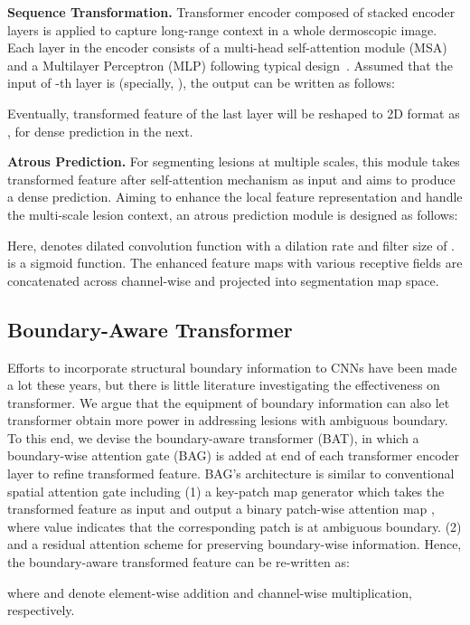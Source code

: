 \documentclass[runningheads]{paper478-llncs}
\begin{document}
\textbf{Sequence Transformation.}
Transformer encoder composed of  stacked encoder layers is applied to capture long-range context in a whole dermoscopic image. 
Each layer in the encoder consists of a multi-head self-attention module (MSA) and a Multilayer Perceptron (MLP) following typical design~\cite{vaswani2017attention}.
Assumed that the input of -th layer is  (specially, ), the output can be written as follows:

Eventually, transformed feature of the last layer  will be reshaped to 2D format as , for dense prediction in the next.

\textbf{Atrous Prediction.} For segmenting lesions at multiple scales, this module takes transformed feature  after self-attention mechanism as input and aims to produce a dense prediction. Aiming to enhance the local feature representation and handle the multi-scale lesion context, an atrous prediction module is designed as follows:

Here,  denotes dilated convolution function with a dilation rate  and filter size of .  is a sigmoid function. The enhanced feature maps  with various receptive fields are concatenated across channel-wise and projected into segmentation map space. 

\subsection{Boundary-Aware Transformer}
\label{section:boundary_prior}
Efforts to incorporate structural boundary information to CNNs have been made a lot these years, but there is little literature investigating the effectiveness on transformer.
We argue that the equipment of boundary information can also let transformer obtain more power in addressing lesions with ambiguous boundary. 
To this end, we devise the boundary-aware transformer (BAT), in which a boundary-wise attention gate (BAG) is added at end of each transformer encoder layer to refine transformed feature. BAG's architecture is similar to conventional spatial attention gate including (1) a key-patch map generator which takes the transformed feature as input and output a binary patch-wise attention map , where value  indicates that the corresponding patch is at ambiguous boundary. (2) and a residual attention scheme for preserving boundary-wise information. Hence, the boundary-aware transformed feature can be re-written as:

where  and  denote element-wise addition and channel-wise multiplication, respectively. 
\end{document}
